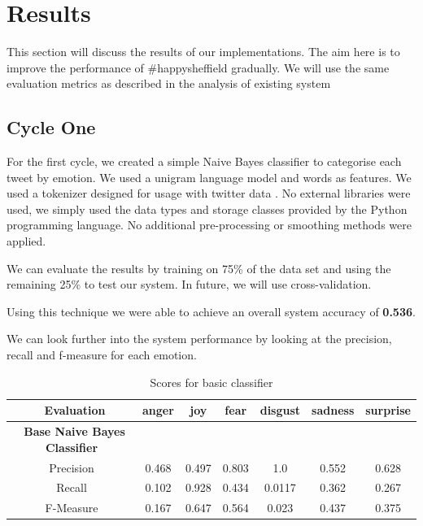 \chapter{Results} \label{results}

This section will discuss the results of our implementations. The aim here is to improve the performance of \#happysheffield gradually. We will use the same evaluation metrics as described in the analysis of existing system

\section{Cycle One} \label{cycle_1}

For the first cycle, we created a simple Naive Bayes classifier to categorise each tweet by emotion. We used a unigram language model and words as features. We used a tokenizer designed for usage with twitter data \cite{OConnor2010}. No external libraries were used, we simply used the data types and storage classes provided by the Python programming language. No additional pre-processing or smoothing methods were applied.

We can evaluate the results by training on 75\% of the data set and using the remaining 25\% to test our system. In future, we will use cross-validation.

Using this technique we were able to achieve an overall system accuracy of \textbf{0.536}.

We can look further into the system performance by looking at the precision, recall and f-measure for each emotion.


\begin{table}[H]
\center
 \begin{tabular}{|c|c|c|c|c|c|c|} 
 \hline
 \ Evaluation & \textbf{anger} & \textbf{joy} & \textbf{fear} & \textbf{disgust} & \textbf{sadness} & \textbf{surprise} \\ [0.5ex] 
 \hline
 \ \textbf{Base Naive Bayes Classifier} & & & & & &  \\ [0.5ex] 
 \hline
 Precision & 0.468 & 0.497 & 0.803 & 1.0 & 0.552 & 0.628 \\ 
 \hline
 Recall & 0.102 & 0.928 & 0.434 & 0.0117 & 0.362 & 0.267 \\
 \hline
 F-Measure & 0.167 & 0.647 & 0.564 & 0.023 & 0.437 & 0.375 \\
 \hline
\end{tabular}
\caption{Scores for basic classifier}
\end{table}


